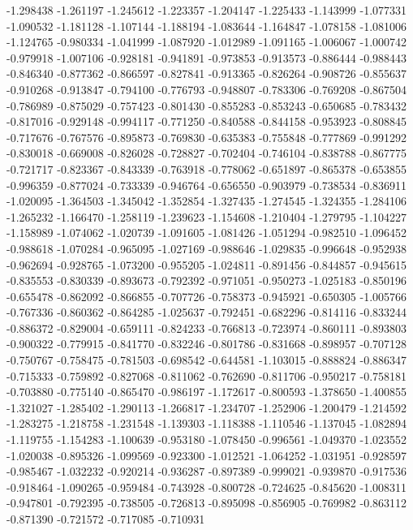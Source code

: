 -1.298438
-1.261197
-1.245612
-1.223357
-1.204147
-1.225433
-1.143999
-1.077331
-1.090532
-1.181128
-1.107144
-1.188194
-1.083644
-1.164847
-1.078158
-1.081006
-1.124765
-0.980334
-1.041999
-1.087920
-1.012989
-1.091165
-1.006067
-1.000742
-0.979918
-1.007106
-0.928181
-0.941891
-0.973853
-0.913573
-0.886444
-0.988443
-0.846340
-0.877362
-0.866597
-0.827841
-0.913365
-0.826264
-0.908726
-0.855637
-0.910268
-0.913847
-0.794100
-0.776793
-0.948807
-0.783306
-0.769208
-0.867504
-0.786989
-0.875029
-0.757423
-0.801430
-0.855283
-0.853243
-0.650685
-0.783432
-0.817016
-0.929148
-0.994117
-0.771250
-0.840588
-0.844158
-0.953923
-0.808845
-0.717676
-0.767576
-0.895873
-0.769830
-0.635383
-0.755848
-0.777869
-0.991292
-0.830018
-0.669008
-0.826028
-0.728827
-0.702404
-0.746104
-0.838788
-0.867775
-0.721717
-0.823367
-0.843339
-0.763918
-0.778062
-0.651897
-0.865378
-0.653855
-0.996359
-0.877024
-0.733339
-0.946764
-0.656550
-0.903979
-0.738534
-0.836911
-1.020095
-1.364503
-1.345042
-1.352854
-1.327435
-1.274545
-1.324355
-1.284106
-1.265232
-1.166470
-1.258119
-1.239623
-1.154608
-1.210404
-1.279795
-1.104227
-1.158989
-1.074062
-1.020739
-1.091605
-1.081426
-1.051294
-0.982510
-1.096452
-0.988618
-1.070284
-0.965095
-1.027169
-0.988646
-1.029835
-0.996648
-0.952938
-0.962694
-0.928765
-1.073200
-0.955205
-1.024811
-0.891456
-0.844857
-0.945615
-0.835553
-0.830339
-0.893673
-0.792392
-0.971051
-0.950273
-1.025183
-0.850196
-0.655478
-0.862092
-0.866855
-0.707726
-0.758373
-0.945921
-0.650305
-1.005766
-0.767336
-0.860362
-0.864285
-1.025637
-0.792451
-0.682296
-0.814116
-0.833244
-0.886372
-0.829004
-0.659111
-0.824233
-0.766813
-0.723974
-0.860111
-0.893803
-0.900322
-0.779915
-0.841770
-0.832246
-0.801786
-0.831668
-0.898957
-0.707128
-0.750767
-0.758475
-0.781503
-0.698542
-0.644581
-1.103015
-0.888824
-0.886347
-0.715333
-0.759892
-0.827068
-0.811062
-0.762690
-0.811706
-0.950217
-0.758181
-0.703880
-0.775140
-0.865470
-0.986197
-1.172617
-0.800593
-1.378650
-1.400855
-1.321027
-1.285402
-1.290113
-1.266817
-1.234707
-1.252906
-1.200479
-1.214592
-1.283275
-1.218758
-1.231548
-1.139303
-1.118388
-1.110546
-1.137045
-1.082894
-1.119755
-1.154283
-1.100639
-0.953180
-1.078450
-0.996561
-1.049370
-1.023552
-1.020038
-0.895326
-1.099569
-0.923300
-1.012521
-1.064252
-1.031951
-0.928597
-0.985467
-1.032232
-0.920214
-0.936287
-0.897389
-0.999021
-0.939870
-0.917536
-0.918464
-1.090265
-0.959484
-0.743928
-0.800728
-0.724625
-0.845620
-1.008311
-0.947801
-0.792395
-0.738505
-0.726813
-0.895098
-0.856905
-0.769982
-0.863112
-0.871390
-0.721572
-0.717085
-0.710931
